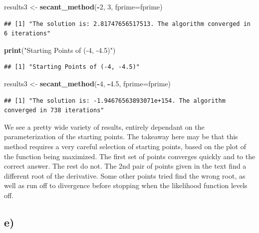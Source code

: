 \documentclass[]{article}
\newenvironment{Shaded}{\begin{snugshade}}{\end{snugshade}}
\newcommand{\KeywordTok}[1]{\textcolor[rgb]{0.13,0.29,0.53}{\textbf{#1}}}
\newcommand{\DataTypeTok}[1]{\textcolor[rgb]{0.13,0.29,0.53}{#1}}
\newcommand{\DecValTok}[1]{\textcolor[rgb]{0.00,0.00,0.81}{#1}}
\newcommand{\FloatTok}[1]{\textcolor[rgb]{0.00,0.00,0.81}{#1}}
\newcommand{\StringTok}[1]{\textcolor[rgb]{0.31,0.60,0.02}{#1}}
\newcommand{\OperatorTok}[1]{\textcolor[rgb]{0.81,0.36,0.00}{\textbf{#1}}}
\newcommand{\NormalTok}[1]{#1}
\begin{document}
\begin{Shaded}
\begin{Highlighting}[]
\NormalTok{results3 <-}\StringTok{ }\KeywordTok{secant_method}\NormalTok{(}\OperatorTok{-}\DecValTok{2}\NormalTok{, }\DecValTok{3}\NormalTok{, }\DataTypeTok{fprime=}\NormalTok{fprime)}
\end{Highlighting}
\end{Shaded}

\begin{verbatim}
## [1] "The solution is: 2.81747656517513. The algorithm converged in 6 iterations"
\end{verbatim}

\begin{Shaded}
\begin{Highlighting}[]
\KeywordTok{print}\NormalTok{(}\StringTok{"Starting Points of (-4, -4.5)"}\NormalTok{)}
\end{Highlighting}
\end{Shaded}

\begin{verbatim}
## [1] "Starting Points of (-4, -4.5)"
\end{verbatim}

\begin{Shaded}
\begin{Highlighting}[]
\NormalTok{results3 <-}\StringTok{ }\KeywordTok{secant_method}\NormalTok{(}\OperatorTok{-}\DecValTok{4}\NormalTok{, }\OperatorTok{-}\FloatTok{4.5}\NormalTok{, }\DataTypeTok{fprime=}\NormalTok{fprime)}
\end{Highlighting}
\end{Shaded}

\begin{verbatim}
## [1] "The solution is: -1.94676563893071e+154. The algorithm converged in 738 iterations"
\end{verbatim}

We see a pretty wide variety of results, entirely dependant on the
parameterization of the starting points. The takeaway here may be that
this method requires a very careful selection of starting points, based
on the plot of the function being maximized. The first set of points
converges quickly and to the correct answer. The rest do not. The 2nd
pair of points given in the text find a different root of the
derivative. Some other points tried find the wrong root, as well as run
off to divergence before stopping when the likelihood function levels
off.

\subsection{e)}\label{e}
\end{document}
